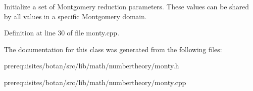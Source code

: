 Initialize a set of Montgomery reduction parameters. These values can be shared by all values in a specific Montgomery domain. 

Definition at line 30 of file monty.\+cpp.



The documentation for this class was generated from the following files\+:\begin{DoxyCompactItemize}
\item 
prerequisites/botan/src/lib/math/numbertheory/monty.\+h\item 
prerequisites/botan/src/lib/math/numbertheory/monty.\+cpp\end{DoxyCompactItemize}
